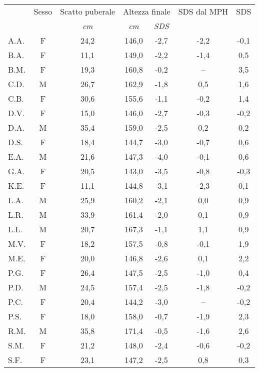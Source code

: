 \begin{table}[!h]
\begin{center}
\begin{tabular}{lcccccc}
\toprule
 & Sesso  & Scatto puberale & \multicolumn{2}{c}{Altezza finale} 	& SDS dal MPH	& \Delta SDS \\
\cmidrule(r){4-5}
  & & \emph{cm} & \emph{cm} 	& \emph{SDS}  	   	&		& 			 	\\
\midrule
A.A.	& F & 24,2 & 146,0 & -2,7  & -2,2  & -0,1    \\
B.A.	& F & 11,1 & 149,0 & -2,2  & -1,4  & 0,5     \\
B.M.	& F & 19,3 & 160,8 & -0,2  & --    & 3,5     \\
C.D.	& M & 26,7 & 162,9 & -1,8  & 0,5   & 1,6     \\
C.B.	& F & 30,6 & 155,6 & -1,1  & -0,2  & 1,4     \\
D.V.	& F & 15,0 & 146,0 & -2,7  & -0,3  & -0,2    \\
D.A.	& M & 35,4 & 159,0 & -2,5  & 0,2   & 0,2      \\
D.S.	& F & 18,4 & 144,7 & -3,0  & -0,7  & 0,6     \\
E.A.	& M & 21,6 & 147,3 & -4,0  & -0,1  & 0,6     \\
G.A.	& F & 20,5 & 143,0 & -3,5  & -0,8  & -0,3        \\
K.E.	& F & 11,1 & 144,8 & -3,1  & -2,3  & 0,1        \\
L.A.	& M & 25,9 & 160,2 & -2,1  & 0,0   & 0,9     \\
L.R.	& M & 33,9 & 161,4 & -2,0  & 0,1   & 0,9     \\
L.L.	& M & 20,7 & 167,3 & -1,1  & 1,1   & 0,9     \\
M.V.	& F & 18,2 & 157,5 & -0,8  & -0,1  & 1,9     \\
M.E.	& F & 20,0 & 146,8 & -2,6  & 0,1   & 2,2     \\
P.G.	& F & 26,4 & 147,5 & -2,5  & -1,0  & 0,4     \\
P.D.	& M & 24,5 & 157,4 & -2,5  & -1,8  & -0,2    \\
P.C.	& F & 20,4 & 144,2 & -3,0  & --  & -0,2   \\
P.S.	& F & 18,0 & 158,0 & -0,7  & -1,9  & 2,3     \\
R.M.	& M & 35,8 & 171,4 & -0,5  & -1,6  & 2,6    \\
S.M.	& F & 21,2 & 148,0 & -2,4  & -0,6  & -0,2    \\
S.F.	& F & 23,1 & 147,2 & -2,5  & 0,8   & 0,3     \\

\end{tabular}
\end{center}
\end{table}
